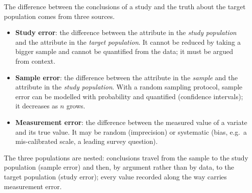 The difference between the conclusions of a study and the truth about the target
population comes from three sources.

\begin{definition}
\begin{itemize}
  \item \textbf{Study error}: the difference between the attribute in the
        \emph{study population} and the attribute in the \emph{target population}.
        It cannot be reduced by taking a bigger sample and cannot be quantified from the
        data; it must be argued from context.
  \item \textbf{Sample error}: the difference between the attribute in the
        \emph{sample} and the attribute in the \emph{study population}. With a random
        sampling protocol, sample error can be modelled with probability and quantified
        (confidence intervals); it decreases as $n$ grows.
  \item \textbf{Measurement error}: the difference between the measured value of a
        variate and its true value. It may be random (imprecision) or systematic
        (bias, e.g.\ a mis-calibrated scale, a leading survey question).
\end{itemize}
\end{definition}

\begin{center}
\end{center}
The three populations are nested: conclusions travel from the sample to the study
population (sample error) and then, by argument rather than by data, to the target
population (study error); every value recorded along the way carries measurement error.

